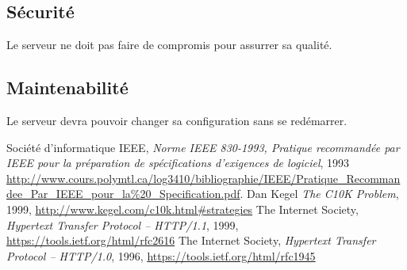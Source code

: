\documentclass{scrreprt}
\begin{document}
\subsection{Sécurité}
Le serveur ne doit pas faire de compromis pour assurrer sa qualité.
\subsection{Maintenabilité}
Le serveur devra pouvoir changer sa configuration sans se redémarrer.


\begin{thebibliography}{9}
  Société d'informatique IEEE,
\emph{Norme IEEE 830-1993, Pratique recommandée par IEEE pour la préparation de
spécifications d’exigences de logiciel}, 1993
\url{http://www.cours.polymtl.ca/log3410/bibliographie/IEEE/Pratique_Recommandee_Par_IEEE_pour_la%20_Specification.pdf}.
  Dan Kegel
\emph{The C10K Problem}, 1999, \url{http://www.kegel.com/c10k.html#strategies}
    The Internet Society,
\emph{Hypertext Transfer Protocol -- HTTP/1.1}, 1999,
\url{https://tools.ietf.org/html/rfc2616}
    The Internet Society,
\emph{Hypertext Transfer Protocol -- HTTP/1.0}, 1996,
\url{https://tools.ietf.org/html/rfc1945}
\end{thebibliography}

\end{document}

